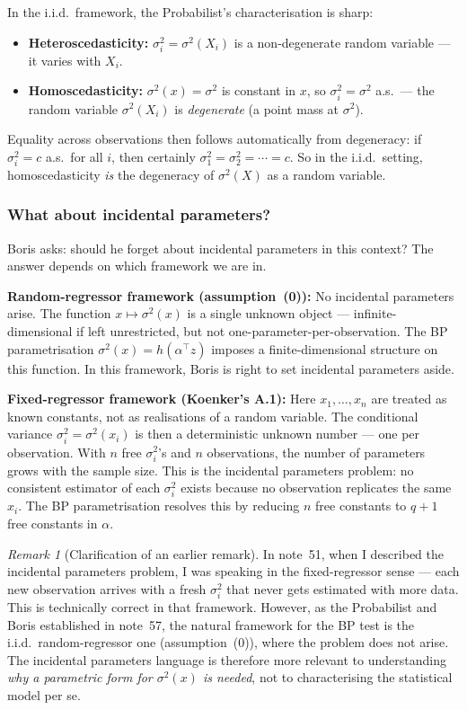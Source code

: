 \documentclass[a4paper,oneside,12pt]{extarticle}
\theoremstyle{plain}
\theoremstyle{definition}
\theoremstyle{remark}
\newtheorem{remark}[proposition]{Remark}
\begin{document}
In the i.i.d.\ framework, the Probabilist's characterisation is sharp:
\begin{itemize}
\item \textbf{Heteroscedasticity:} $\sigma_i^2 = \sigma^2(X_i)$ is a
  non-degenerate random variable — it varies with $X_i$.
\item \textbf{Homoscedasticity:} $\sigma^2(x) = \sigma^2$ is constant
  in $x$, so $\sigma_i^2 = \sigma^2$ a.s.\ — the random variable
  $\sigma^2(X_i)$ is \emph{degenerate} (a point mass at $\sigma^2$).
\end{itemize}
Equality across observations then follows automatically from
degeneracy: if $\sigma_i^2 = c$ a.s.\ for all $i$, then certainly
$\sigma_1^2 = \sigma_2^2 = \cdots = c$.  So in the i.i.d.\ setting,
homoscedasticity \emph{is} the degeneracy of $\sigma^2(X)$ as a
random variable.

\subsubsection*{What about incidental parameters?}

Boris asks: should he forget about incidental parameters in this
context?  The answer depends on which framework we are in.

\medskip
\noindent\textbf{Random-regressor framework (assumption~(0)):} No
incidental parameters arise.  The function $x \mapsto \sigma^2(x)$
is a single unknown object — infinite-dimensional if left
unrestricted, but not one-parameter-per-observation.  The BP
parametrisation $\sigma^2(x) = h(\alpha^\top z)$ imposes a
finite-dimensional structure on this function.  In this framework,
Boris is right to set incidental parameters aside.

\medskip
\noindent\textbf{Fixed-regressor framework (Koenker's A.1):} Here
$x_1, \ldots, x_n$ are treated as known constants, not as
realisations of a random variable.  The conditional variance
$\sigma_i^2 = \sigma^2(x_i)$ is then a deterministic unknown number —
one per observation.  With $n$ free $\sigma_i^2$'s and $n$
observations, the number of parameters grows with the sample size.
This is the incidental parameters problem: no consistent estimator of
each $\sigma_i^2$ exists because no observation replicates the same
$x_i$.  The BP parametrisation resolves this by reducing $n$ free
constants to $q+1$ free constants in $\alpha$.

\begin{remark}[Clarification of an earlier remark]
In note~51, when I described the incidental parameters problem, I was
speaking in the fixed-regressor sense — each new observation arrives
with a fresh $\sigma_i^2$ that never gets estimated with more data.
This is technically correct in that framework.  However, as the Probabilist and
Boris established in note~57, the natural framework for the BP test
is the i.i.d.\ random-regressor one (assumption~(0)), where the
problem does not arise.  The incidental parameters language is
therefore more relevant to understanding \emph{why a parametric form
for $\sigma^2(x)$ is needed}, not to characterising the statistical
model per se.
\end{remark}
\end{document}
